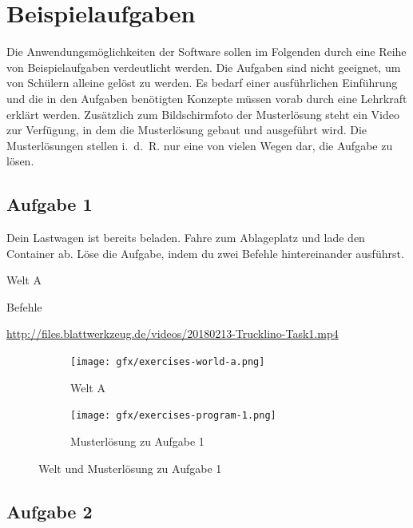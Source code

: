 \chapter{Beispielaufgaben}
\label{sec:exercises}

Die Anwendungsmöglichkeiten der Software sollen im Folgenden durch eine Reihe von Beispielaufgaben verdeutlicht werden. Die Aufgaben sind nicht geeignet, um von Schülern alleine gelöst zu werden. Es bedarf einer ausführlichen Einführung und die in den Aufgaben benötigten Konzepte müssen vorab durch eine Lehrkraft erklärt werden. Zusätzlich zum Bildschirmfoto der Musterlösung steht ein Video zur Verfügung, in dem die Musterlösung gebaut und ausgeführt wird. Die Musterlösungen stellen i.~d.~R. nur eine von vielen Wegen dar, die Aufgabe zu lösen.

\section*{Aufgabe 1}
\label{sec:exercises:1}

Dein Lastwagen ist bereits beladen. Fahre zum Ablageplatz und lade den Container ab. Löse die Aufgabe, indem du zwei Befehle hintereinander ausführst.

\begin{description}[noitemsep]
  \item[Welt wählen:] Welt A
  \item[Du brauchst:] Befehle
  \item[Video:] \url{http://files.blattwerkzeug.de/videos/20180213-Trucklino-Task1.mp4}
\end{description}

\begin{figure}[H]
  \begin{subfigure}[b]{0.40\textwidth}
    \texttt{[image: gfx/exercises-world-a.png]}
    \caption{Welt A}
  \end{subfigure}\hfill
  \begin{subfigure}[b]{0.40\textwidth}
    \texttt{[image: gfx/exercises-program-1.png]}
    \caption{Musterlösung zu Aufgabe 1}
  \end{subfigure}\hfill
  \caption{Welt und Musterlösung zu Aufgabe 1}
\end{figure}

\pagebreak

\section*{Aufgabe 2}
\label{sec:exercises:2}

